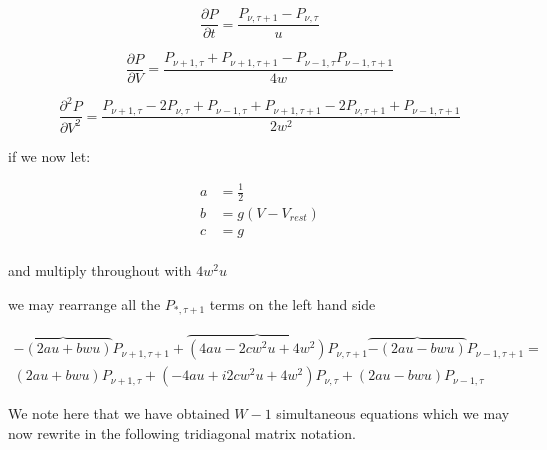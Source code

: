 \documentclass[10pt]{article}
\begin{document}
\begin{equation}
    \frac{\partial P}{\partial t} = \frac{P_{\nu,\tau +1 } -
    P_{\nu,\tau}}{u}
\end{equation}

\begin{equation}
    \frac{\partial P}{\partial V} = 
    \frac{P_{\nu +1,\tau } + P_{\nu +1,\tau +1 } -
    P_{\nu - 1,\tau } P_{\nu -1,\tau +1}}
    {4w}
\end{equation}

\begin{equation}
    \frac{\partial^2 P}{\partial V^2} = 
    \frac{P_{\nu+1,\tau} - 2 P_{\nu,\tau} + P_{\nu-1,\tau} +
    P_{\nu+1,\tau+1} - 2 P_{\nu,\tau+1} + P_{\nu-1,\tau+1}}
    {2w^2}
\end{equation}

if we now let:

\begin{align*}
a &= \frac{1}{2} \\
b &= g(V - V_{rest}) \\
c &= g \\
\end{align*}

and multiply throughout with $4w^2u$

we may rearrange all the $P_{*,\tau+1} $ terms on the left hand side

\begin{multline}
    \overbrace{-(2au+bwu)} P_{\nu+1,\tau+1} + 
    \overbrace{(4au - 2cw^2u + 4w^2)} P_{\nu,\tau+1} 
    \overbrace{-(2au-bwu)} P_{\nu-1,\tau+1} 
    =  \\
    (2au+bwu) P_{\nu+1,\tau} +  
    (-4au +i  2cw^2u + 4w^2) P_{\nu,\tau} + 
    (2au-bwu) P_{\nu-1,\tau} 
\end{multline}

We note here that we have obtained $W-1$ simultaneous equations which
we may now rewrite in the following tridiagonal matrix notation.
\end{document}
